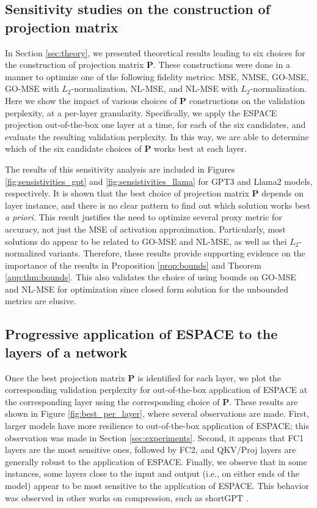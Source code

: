 \documentclass{article}
\theoremstyle{plain}
\begin{document}
\subsection{Sensitivity studies on the construction of projection matrix}
In Section \ref{sec:theory}, we presented theoretical results leading to six choices for the construction of projection matrix $\mathbf{P}$. These constructions were done in a manner to optimize one of the following fidelity metrics: MSE, NMSE, GO-MSE, GO-MSE with $L_2$-normalization, NL-MSE, and NL-MSE with $L_2$-normalization. Here we show the impact of various choices of $\mathbf{P}$ constructions on the validation perplexity, at a per-layer granularity. Specifically, we apply the ESPACE projection out-of-the-box one layer at a time, for each of the six candidates, and evaluate the resulting validation perplexity. In this way, we are able to determine which of the six candidate choices of $\mathbf{P}$ works best at each layer.

The results of this sensitivity analysis are included in Figures \ref{fig:sensistivities_gpt} and \ref{fig:sensistivities_llama} for GPT3 and Llama2 models, respectively. It is shown that the best choice of projection matrix $\mathbf{P}$ depends on layer instance, and there is no clear pattern to find out which solution works best \textit{a priori}. This result justifies the need to optimize several proxy metric for accuracy, not just the MSE of activation approximation. Particularly, most solutions do appear to be related to GO-MSE and NL-MSE, as well as thei $L_2$-normalized variants. Therefore, these results provide supporting evidence on the importance of the results in Proposition \ref{prop:bounds} and Theorem \ref{app:thm:bounds}. This also validates the choice of using bounds on GO-MSE and NL-MSE for optimization since closed form solution for the unbounded metrics are elusive.

\subsection{Progressive application of ESPACE to the layers of a network}
\label{app:prog_sweeps}

Once the best projection matrix $\mathbf{P}$ is identified for each layer, we plot the corresponding validation perplexity for out-of-the-box application of ESPACE at the corresponding layer using the corresponding choice of $\mathbf{P}$. These results are shown in Figure \ref{fig:best_per_layer}, where several observations are made. First, larger models have more resilience to out-of-the-box application of ESPACE; this observation was made in Section \ref{sec:experiments}. Second, it appears that FC1 layers are the most sensitive ones, followed by FC2, and QKV/Proj layers are generally robust to the application of ESPACE. Finally, we observe that in some instances, some layers close to the input and output (i.e., on either ends of the model) appear to be most sensitive to the application of ESPACE. This behavior was observed in other works on compression, such as shortGPT \cite{men2024shortgpt}.
\end{document}
